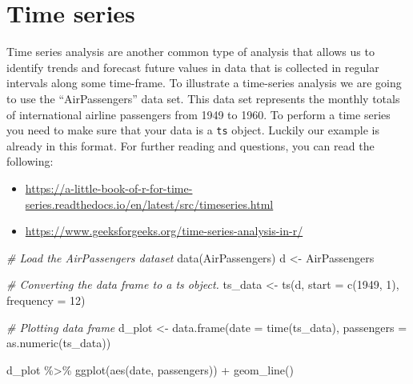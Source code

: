 \documentclass[
]{book}
\newenvironment{Shaded}{\begin{snugshade}}{\end{snugshade}}
\newcommand{\AttributeTok}[1]{\textcolor[rgb]{0.77,0.63,0.00}{#1}}
\newcommand{\CommentTok}[1]{\textcolor[rgb]{0.56,0.35,0.01}{\textit{#1}}}
\newcommand{\DecValTok}[1]{\textcolor[rgb]{0.00,0.00,0.81}{#1}}
\newcommand{\FunctionTok}[1]{\textcolor[rgb]{0.00,0.00,0.00}{#1}}
\newcommand{\NormalTok}[1]{#1}
\newcommand{\OtherTok}[1]{\textcolor[rgb]{0.56,0.35,0.01}{#1}}
\newcommand{\SpecialCharTok}[1]{\textcolor[rgb]{0.00,0.00,0.00}{#1}}
\providecommand{\tightlist}{%
  \setlength{\itemsep}{0pt}\setlength{\parskip}{0pt}}
\begin{document}
\hypertarget{time-series}{%
\section{Time series}\label{time-series}}

Time series analysis are another common type of analysis that allows us to identify trends and forecast future values in data that is collected in regular intervals along some time-frame.
To illustrate a time-series analysis we are going to use the ``AirPassengers'' data set. This data set represents the monthly totals of international airline passengers from 1949 to 1960.
To perform a time series you need to make sure that your data is a \texttt{ts} object. Luckily our example is already in this format. For further reading and questions, you can read the following:

\begin{itemize}
\tightlist
\item
  \url{https://a-little-book-of-r-for-time-series.readthedocs.io/en/latest/src/timeseries.html}
\item
  \url{https://www.geeksforgeeks.org/time-series-analysis-in-r/}
\end{itemize}

\begin{Shaded}
\begin{Highlighting}[]
\CommentTok{\# Load the AirPassengers dataset}
\FunctionTok{data}\NormalTok{(AirPassengers)}
\NormalTok{d }\OtherTok{\textless{}{-}}\NormalTok{ AirPassengers}

\CommentTok{\# Converting the data frame to a ts object.}
\NormalTok{ts\_data }\OtherTok{\textless{}{-}} \FunctionTok{ts}\NormalTok{(d, }\AttributeTok{start =} \FunctionTok{c}\NormalTok{(}\DecValTok{1949}\NormalTok{, }\DecValTok{1}\NormalTok{), }\AttributeTok{frequency =} \DecValTok{12}\NormalTok{)}

\CommentTok{\# Plotting data frame}
\NormalTok{d\_plot }\OtherTok{\textless{}{-}} \FunctionTok{data.frame}\NormalTok{(}\AttributeTok{date =} \FunctionTok{time}\NormalTok{(ts\_data), }\AttributeTok{passengers =} \FunctionTok{as.numeric}\NormalTok{(ts\_data))}

\NormalTok{d\_plot }\SpecialCharTok{\%\textgreater{}\%} 
  \FunctionTok{ggplot}\NormalTok{(}\FunctionTok{aes}\NormalTok{(date, passengers)) }\SpecialCharTok{+}
  \FunctionTok{geom\_line}\NormalTok{()}
\end{Highlighting}
\end{Shaded}
\end{document}
